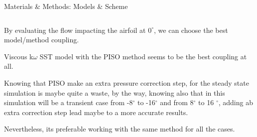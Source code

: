 \documentclass[english,10pt,a4paper,twoside]{beamer}
\begin{document}
\begin{frame}[shrink=55]{Materials \& Methods: Models \& Scheme}
\begin{landscape}
\begin{table}[H]
\begin{tabular}{|cccccccccccc|}
				\end{tabular}
			\end{table}
		\end{landscape}
		\vspace{0.5cm}
		By evaluating the flow impacting the airfoil at $0^\circ$, we can choose the best model/method coupling. \newline
		
		Viscous k$\omega$ SST model with the PISO method seems to be the best coupling at all. \newline
		
		Knowing that PISO make an extra pressure correction step, for the steady state simulation is maybe quite a waste, by the way, knowing also that in this simulation will be a transient case from -8$^\circ$ to -16$^\circ$ and from 8$^\circ$ to 16 $^\circ$, adding ab extra correction step lead maybe to a more accurate results.  
		
		Nevertheless, its preferable working with the same method for all the cases. \newline
		
		
		
		
		
	\end{frame}
\end{document}
